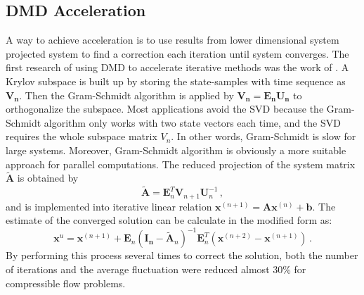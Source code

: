 \subsection{DMD Acceleration}
A way to achieve acceleration is to use results from lower dimensional system projected system to find a correction each iteration until system converges.
The first research of using DMD to accelerate iterative methods was the work of \citet{andersson_novel}.
A Krylov subspace is built up by storing the state-samples with time sequence as $\mathbf{V_n}$.
Then the Gram-Schmidt algorithm is applied by $\mathbf{V_n} = \mathbf{{E_n U_n}}$ to orthogonalize the subspace.
Most applications avoid the SVD because the Gram-Schmidt algorithm only works with two state vectors each time, and the SVD requires the whole subspace matrix $V_n$. 
In other words, Gram-Schmidt is slow for large systems.
Moreover, Gram-Schmidt algorithm is obviously a more suitable approach for parallel computations. 
The reduced projection of the system matrix $\mathbf{\tilde{A}}$ is obtained by 
\begin{equation}
 \mathbf{\tilde{A}} = \mathbf{E}_n^T \mathbf{V}_{n+1} \mathbf{U}_n^{-1}  \, ,
 \label{eq:andersson_reduce}
\end{equation}
and is implemented into iterative linear relation $\mathbf{x}^{(n+1)} = \mathbf{A}\mathbf{x}^{(n)} + \mathbf{b}$.
The estimate of the converged solution can be calculate in the modified form as:
\begin{equation}
 \mathbf{x}^{u} = \mathbf{x}^{(n+1)} + \mathbf{E}_n(\mathbf{I_n} - \mathbf{\tilde{A}}_n)^{-1} \mathbf{E}_n^T(\mathbf{x}^{(n+2)} - \mathbf{x}^{(n+1)}) \, .
 \label{eq:andersson}
\end{equation}
By performing this process several times to correct the solution, both the number of iterations and the average fluctuation were reduced almost 30\% for compressible flow problems. 

